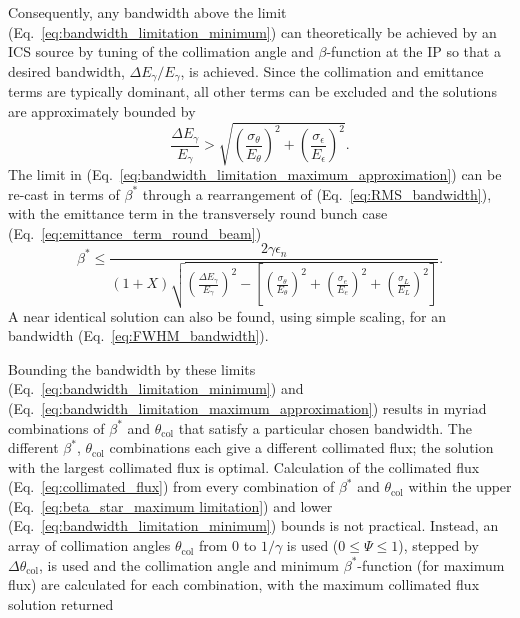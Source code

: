 \documentclass[../main.tex]{subfiles}
\begin{document}
Consequently, any bandwidth above the 
limit (Eq.~\ref{eq:bandwidth_limitation_minimum}) can theoretically be achieved by an ICS source by tuning of the collimation angle and $\beta$-function at the IP so that a desired bandwidth, $\Delta E_{\gamma}/E_{\gamma}$, is achieved. Since the collimation and emittance terms are typically dominant, all other terms can be excluded and the solutions are approximately bounded by
\begin{equation}
\frac{\Delta E_{\gamma}}{E_{\gamma}} > \sqrt{\left(\frac{ \sigma_{\theta}}{E_{\theta}}\right)^{2}+\left(\frac{\sigma_{\epsilon}}{E_{\epsilon}}\right)^{2}}.
\label{eq:bandwidth_limitation_maximum_approximation}
\end{equation}
The limit in (Eq.~\ref{eq:bandwidth_limitation_maximum_approximation}) can be re-cast in terms of $\beta^{*}$ through a rearrangement of (Eq.~\ref{eq:RMS_bandwidth}), with the emittance term in the transversely round bunch case (Eq.~\ref{eq:emittance_term_round_beam})
\begin{equation}
\beta^{*} \leq \frac{2\gamma\epsilon_{n}}{\left(1+X\right)\sqrt{\left(\frac{\Delta E_{\gamma}}{E_{\gamma}}\right)^{2}-\left[\left(\frac{\sigma_{\theta}}{E_{\theta}}\right)^{2}+\left(\frac{\sigma_{e}}{E_{e}}\right)^{2}+\left(\frac{\sigma_{L}}{E_{L}}\right)^{2}\right]}}.
\label{eq:beta_star_maximum limitation}
\end{equation}
A near identical solution can also be found, using simple scaling, for an  bandwidth (Eq.~\ref{eq:FWHM_bandwidth}). 

Bounding the  bandwidth by these limits (Eq.~\ref{eq:bandwidth_limitation_minimum}) and  (Eq.~\ref{eq:bandwidth_limitation_maximum_approximation}) results in myriad combinations of $\beta^{*}$ and $\theta_{\mathrm{col}}$ that satisfy a particular chosen bandwidth. The different $\beta^{*}$, $\theta_{\mathrm{col}}$ combinations each give a different collimated flux; the solution with the largest collimated flux is optimal. Calculation of the collimated flux (Eq.~\ref{eq:collimated_flux}) from every combination of $\beta^{*}$ and $\theta_{\mathrm{col}}$ within the upper (Eq.~\ref{eq:beta_star_maximum limitation}) and lower (Eq.~\ref{eq:bandwidth_limitation_minimum}) bounds is not practical. Instead, an array of collimation angles $\theta_{\mathrm{col}}$ from 0 to $1/\gamma$ is used ($0\leq\Psi\leq1$), stepped by $\Delta\theta_{\mathrm{col}}$, is used and the collimation angle and minimum $\beta^{*}$-function (for maximum flux) are calculated for each combination, with the maximum collimated flux solution returned 
\end{document}
